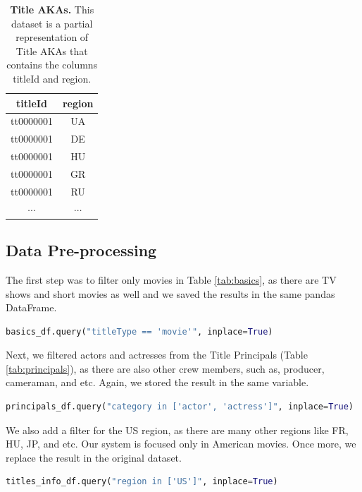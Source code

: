 \begin{table}[ht]
	\centering
	\caption{\textbf{Title AKAs.} This dataset is a partial representation of Title AKAs that contains the columns titleId and region.}	
	\footnotesize
	\begin{tabular}{cc}
		\toprule
		titleId   & region   \\
		\midrule
		tt0000001 & UA       \\
		tt0000001 & DE       \\
		tt0000001 & HU       \\
		tt0000001 & GR       \\		
		tt0000001 & RU       \\
		$\cdots$  & $\cdots$ \\
		\bottomrule
	\end{tabular}	
 	\label{tab:aka}
\end{table}


\subsection{Data Pre-processing}

The first step was to filter only movies in Table \ref{tab:basics}, as there are TV shows and short movies as well and we saved the results in the same pandas DataFrame.

\begin{lstlisting}[language=python]
basics_df.query("titleType == 'movie'", inplace=True)
\end{lstlisting}

Next, we filtered actors and actresses from the Title Principals (Table \ref{tab:principals}), as there are also other crew members, such as, producer, cameraman, and etc. Again, we stored the result in the same variable.

\begin{lstlisting}[language=python]
principals_df.query("category in ['actor', 'actress']", inplace=True)
\end{lstlisting}

We also add a filter for the US region, as there are many other regions like FR, HU, JP, and etc. Our system is focused only in American movies. Once more, we replace the result in the original dataset.

\begin{lstlisting}[language=python]
titles_info_df.query("region in ['US']", inplace=True)
\end{lstlisting}

